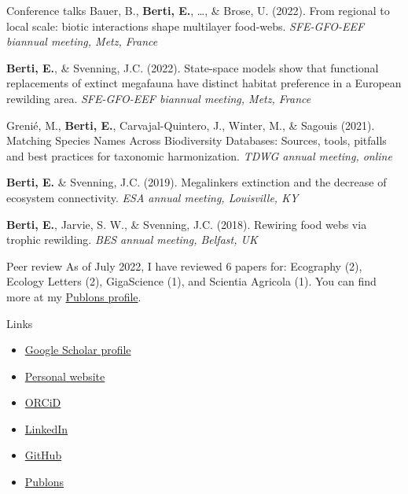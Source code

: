 \documentclass{resume} %
\begin{document}
\begin{rSection}{Conference talks}
Bauer, B., \textbf{Berti, E.}, \dots, \& Brose, U. (2022). From regional to local scale: biotic interactions shape multilayer food-webs. \textit{SFE-GFO-EEF biannual meeting, Metz, France}

\textbf{Berti, E.}, \& Svenning, J.C. (2022). State-space models show that functional replacements of extinct megafauna have distinct habitat preference in a European rewilding area. \textit{SFE-GFO-EEF biannual meeting, Metz, France}

Grenié, M., \textbf{Berti, E.}, Carvajal-Quintero, J., Winter, M., \& Sagouis (2021). Matching Species Names Across Biodiversity Databases: Sources, tools, pitfalls and best practices for taxonomic harmonization. \textit{TDWG annual meeting, online}

\textbf{Berti, E.} \& Svenning, J.C. (2019). Megalinkers extinction and the decrease of ecosystem connectivity. \textit{ESA annual meeting, Louisville, KY}

\textbf{Berti, E.}, Jarvie, S. W., \& Svenning, J.C. (2018). Rewiring food webs via trophic rewilding. \textit{BES annual meeting, Belfast, UK}
\end{rSection}

\begin{rSection}{Peer review}
As of July 2022, I have reviewed 6 papers for: Ecography (2), Ecology Letters (2), GigaScience (1), and Scientia Agricola (1). You can find more at my \href{https://publons.com/wos-op/researcher/4208953/emilio-berti/}{Publons profile}.
\end{rSection}

\begin{rSection}{Links}
\begin{minipage}{0.5\textwidth}
\begin{itemize}
    \item \href{https://scholar.google.com/citations?user=5KPh-oUAAAAJ&hl=en}{Google Scholar profile}
    \item \href{https://emilio-berti.github.io/}{Personal website}
    \item \href{https://orcid.org/0000-0001-9286-011X}{ORCiD}
\end{itemize}
\end{minipage}
\begin{minipage}{0.5\textwidth}
\begin{itemize}
    \item \href{https://www.linkedin.com/in/emilio-berti-55a348146}{LinkedIn}
    \item \href{https://github.com/emilio-berti}{GitHub}
    \item \href{https://publons.com/wos-op/researcher/4208953/emilio-berti/peer-review/}{Publons}
\end{itemize}
\end{minipage}
\end{rSection}
\end{document}
